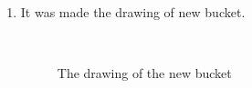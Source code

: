 \begin{enumerate}
\begin{enumerate}
		 \item It was made the drawing of new bucket.
		 		         \begin{figure}[H]
		 		         	\begin{minipage}[h]{0.2\linewidth}
		 		         		\center  
		 		         	\end{minipage}
		 		         	\begin{minipage}[h]{0.6\linewidth}
		 		         		\caption{The drawing of the new bucket}
		 		         	\end{minipage}
		 		         \end{figure}
		 		         

\end{enumerate}
\end{enumerate}
